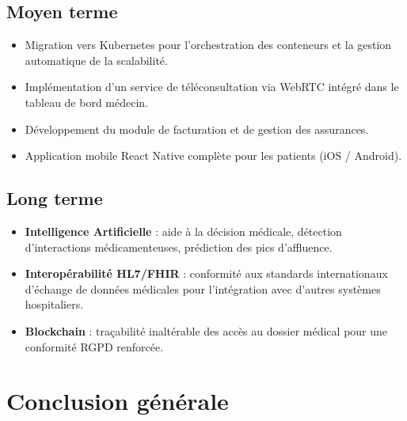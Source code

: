 \subsection{Moyen terme}

\begin{itemize}[itemsep=4pt]
  \item Migration vers Kubernetes pour l'orchestration des conteneurs et la
    gestion automatique de la scalabilité.
  \item Implémentation d'un service de téléconsultation via WebRTC intégré
    dans le tableau de bord médecin.
  \item Développement du module de facturation et de gestion des assurances.
  \item Application mobile React Native complète pour les patients (iOS / Android).
\end{itemize}

\subsection{Long terme}

\begin{itemize}[itemsep=4pt]
  \item \textbf{Intelligence Artificielle} : aide à la décision médicale,
    détection d'interactions médicamenteuses, prédiction des pics d'affluence.
  \item \textbf{Interopérabilité HL7/FHIR} : conformité aux standards
    internationaux d'échange de données médicales pour l'intégration avec
    d'autres systèmes hospitaliers.
  \item \textbf{Blockchain} : traçabilité inaltérable des accès au dossier
    médical pour une conformité RGPD renforcée.
\end{itemize}

\section{Conclusion générale}

